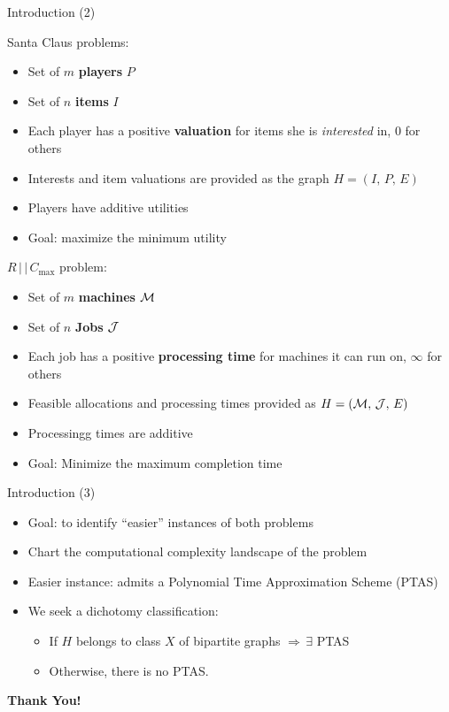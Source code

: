 \begin{frame}[t]{Introduction (2)}
    \begin{minipage}[t]{0.48\textwidth}
        Santa Claus problems:
        \begin{itemize}
            \item<2-> Set of $m$ \textbf{players} $P$
            \item<3-> Set of $n$ \textbf{items} $I$
            \item<4-> Each player has a positive \textbf{valuation} for items she is \emph{interested} in, 0 for others
            \item<5-> Interests and item valuations are provided as the graph $H = (I, \, P, \, E)$
            \item<6-> Players have additive utilities
            \item<7-> Goal: maximize the minimum utility
        \end{itemize}
    \end{minipage}    
    \begin{minipage}[t]{0.48\textwidth}
        $R \, | \, | \, C_{\max}$ problem:
        \begin{itemize}
            \item<8-> Set of $m$ \textbf{machines} $\mathcal{M}$
            \item<9-> Set of $n$ \textbf{Jobs} $\mathcal{J}$
            \item<10-> Each job has a positive \textbf{processing time} for machines it can run on, $\infty$ for others
            \item<11-> Feasible allocations and processing times provided as $H = (\mathcal{M}, \, \mathcal{J}, \, E)$
            \item<13-> Processingg times are additive
            \item<14-> Goal: Minimize the maximum completion time
        \end{itemize}
    \end{minipage}
\end{frame}

\begin{frame}[t]{Introduction (3)}
    \begin{itemize}
        \item<1-> Goal: to identify ``easier'' instances of both problems
        \item<2-> Chart the computational complexity landscape of the  problem
        \item<3-> Easier instance: admits a Polynomial Time Approximation Scheme (PTAS)
        \item<4-> We seek a dichotomy classification: 
            \begin{itemize}
                \item<5->If $H$ belongs to class $X$ of bipartite graphs $\Rightarrow \, \exists$ PTAS
                \item<6-> Otherwise, there is no PTAS.
            \end{itemize}
    \end{itemize}
\end{frame}

\begin{frame}[t,plain]
    \begin{center}
        \vspace{4cm}
        {\LARGE \textbf{Thank You!}}
    \end{center}
\end{frame}